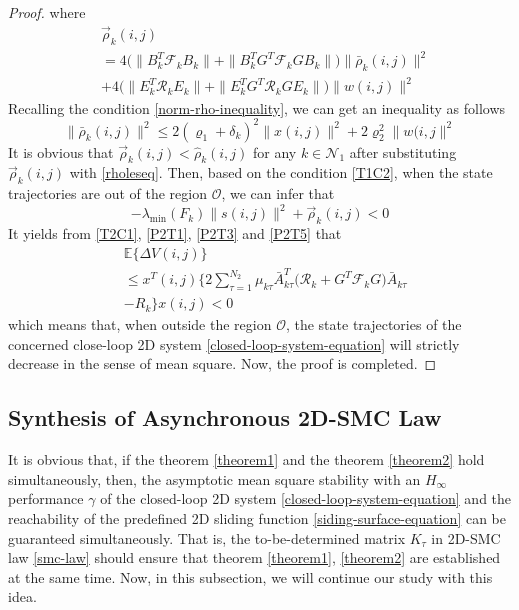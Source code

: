\documentclass[conference]{IEEEtran}
\begin{document}
\begin{proof}
	where
	\begin{equation*}
		\begin{split}
			&\vec{\rho}_{k}(i,j)\\
			&= 4\big(\|B^{T}_{k}\mathcal{F}_{k}B_{k}\|+ \|B^{T}_{k}G^{T}\mathcal{F}_{k}GB_{k}\|\big) \|\bar{\rho}_{k}(i,j)\|^{2} \\
			&+ 4\big(\|E^{T}_{k}\mathcal{R}_{k}E_{k}\|+ \|E^{T}_{k}G^{T}\mathcal{R}_{k}GE_{k}\|\big) \|w(i,j)\|^{2} 
		\end{split}
	\end{equation*}
	Recalling the condition \eqref{norm-rho-inequality}, we can get an inequality as follows
	\begin{equation}\label{rholeseq}
		\|\bar{\rho}_{k}(i,j)\|^{2} \leq 2(\varrho_{1}+\delta_{k})^{2}\|x(i,j)\|^{2} +2\varrho_{2}^{2}\|w(i,j\|^{2} 
	\end{equation}	  
	It is obvious that $\vec{\rho}_{k}(i,j) < \hat{\rho}_{k}(i,j) $ for any $k\in\mathcal{N}_{1}$ after substituting $\vec{\rho}_{k}(i,j)$ with \eqref{rholeseq}. 
	Then, based on the condition \eqref{T1C2}, when the state trajectories are out of the region $\mathcal{O}$, we can infer that
	\begin{equation}\label{P2T5}
		-\lambda_{\mathrm{min}}(F_{k})\|s(i,j)\|^{2} + \vec{\rho}_{k}(i,j) <0
	\end{equation}
	It yields from \eqref{T2C1}, \eqref{P2T1}, \eqref{P2T3} and \eqref{P2T5} that 
	\begin{equation}
		\begin{split}
			&\mathbb{E}\{\varDelta V(i,j) \}\\
			&\leq x^{T}(i,j)\Big\{ 2\sum_{\tau =1}^{N_{2}}\mu_{k\tau }\bar{A}^{T}_{k\tau }\big(\mathcal{R}_{k} +G^{T}\mathcal{F}_{k}G \big)\bar{A}_{k\tau }\\ &-R_{k} \Big\} x(i,j)<0
		\end{split}
	\end{equation}
	which means that, when outside the region $\mathcal{O}$,  the state trajectories of the concerned close-loop 2D system \eqref{closed-loop-system-equation} will strictly decrease in the sense of mean square. Now, the proof is completed.
	 
\end{proof}

 
\subsection{  Synthesis of Asynchronous 2D-SMC Law }\label{smc-law-synthesis} 
It is obvious that, if the theorem \ref{theorem1} and the theorem \ref{theorem2} hold simultaneously, then, the asymptotic mean square stability  with an $H_{\infty}$  performance $\gamma$ of the closed-loop 2D system \eqref{closed-loop-system-equation} and the reachability of the predefined 2D sliding function \eqref{siding-surface-equation} can be guaranteed simultaneously. That is, the to-be-determined matrix $K_{\tau }$ in 2D-SMC law \eqref{smc-law} should ensure that theorem \ref{theorem1}, \ref{theorem2} are established at the same time. Now, in this subsection, we will continue our study with this idea.
\end{document}
